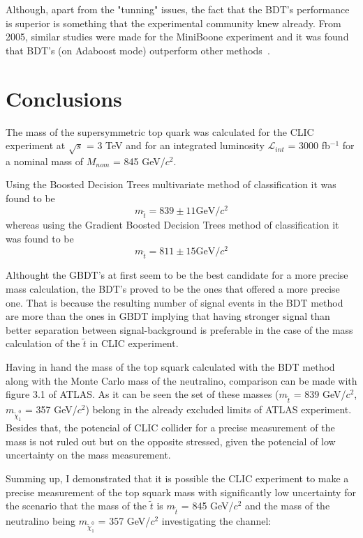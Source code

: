 \documentclass[12pt,a4paper]{report}
\begin{document}
Although, apart from the "tunning" issues, the fact that the BDT's performance is superior is 
something that the experimental community knew already. 
From 2005, similar studies were made for the MiniBoone experiment and 
it was found that BDT's (on Adaboost mode) outperform other methods~\cite{yang2005studies}.

\chapter{Conclusions}


The mass of the supersymmetric top quark was calculated for the CLIC experiment at $\surd s$ = 3 TeV and for 
an integrated luminosity $\mathcal{L}_{int}$ = 3000 fb$^{-1}$ for a nominal mass of $M_{nom}$ = 845 GeV/$c^{2}$.

Using the Boosted Decision Trees multivariate method of classification it was found to be 
\begin{equation}
 m_{\tilde{t}} = 839 \pm 11 \textrm{GeV}/c^{2}
\end{equation}
whereas using the Gradient Boosted Decision Trees method of classification it was found to be 
\begin{equation}
  m_{\tilde{t}} = 811 \pm 15 \textrm{GeV}/c^{2}
\end{equation}

Althought the GBDT's at first seem to be the best candidate for a more precise mass calculation, the BDT's 
proved to be the ones that offered a more precise one. That is because the resulting number of signal events in the BDT 
method are more than the ones in GBDT implying that having stronger signal than better separation between 
signal-background is preferable in the case of the mass calculation of the $\tilde{t}$ in CLIC experiment.

Having in hand the mass of the top squark calculated with the BDT method along with the Monte Carlo mass
of the neutralino, comparison can be made with figure 3.1 of ATLAS. As it can be seen the set of these masses 
($m_{\tilde{t}}$ = 839 GeV/$c^{2}$,$m_{\tilde{\chi}_{1}^{0}}$ = 357 GeV/$c^{2}$) belong in the already 
excluded limits 
of ATLAS experiment. Besides that, the potencial of CLIC collider for a precise measurement of the mass is 
not ruled out but on the opposite stressed, given the potencial of low uncertainty on the mass measurement.

Summing up, I demonstrated that it is possible the CLIC experiment to make a precise measurement of the top
squark mass with significantly low uncertainty for the scenario that the mass of the $\tilde{t}$ is 
$m_{\tilde{t}}$ = 845 GeV/$c^{2}$ and the mass of the neutralino being $m_{\tilde{\chi}_{1}^{0}}$ = 
357 GeV/$c^{2}$ investigating the channel:
\end{document}
